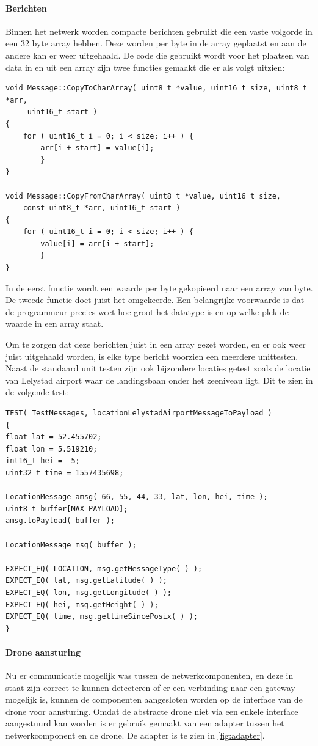 \documentclass[a4paper, 11pt, oneside]{report}
\begin{document}
\paragraph{Berichten}
Binnen het netwerk worden compacte berichten gebruikt die een vaste volgorde in een 32 byte array hebben.
Deze worden per byte in de array geplaatst en aan de andere kan er weer uitgehaald.
De code die gebruikt wordt voor het plaatsen van data in en uit een array zijn twee functies gemaakt die er als volgt uitzien:
\begin{lstlisting}
void Message::CopyToCharArray( uint8_t *value, uint16_t size, uint8_t *arr,
	 uint16_t start )
{
	for ( uint16_t i = 0; i < size; i++ ) {
		arr[i + start] = value[i];
		}
}

void Message::CopyFromCharArray( uint8_t *value, uint16_t size,
	const uint8_t *arr, uint16_t start )
{
	for ( uint16_t i = 0; i < size; i++ ) {
		value[i] = arr[i + start];
		}
}
\end{lstlisting}
In de eerst functie wordt een waarde per byte gekopieerd naar een array van byte.
De tweede functie doet juist het omgekeerde.
Een belangrijke voorwaarde is dat de programmeur precies weet hoe groot het datatype is en op welke plek de waarde in een array staat. 


Om te zorgen dat deze berichten juist in een array gezet worden, en er ook weer juist uitgehaald worden, is elke type bericht voorzien een meerdere unittesten.
Naast de standaard unit testen zijn ook bijzondere locaties getest zoals de locatie van Lelystad airport waar de landingsbaan onder het zeeniveau ligt.
Dit te zien in de volgende test:
\begin{lstlisting}
TEST( TestMessages, locationLelystadAirportMessageToPayload )
{
float lat = 52.455702;
float lon = 5.519210;
int16_t hei = -5;
uint32_t time = 1557435698;

LocationMessage amsg( 66, 55, 44, 33, lat, lon, hei, time );
uint8_t buffer[MAX_PAYLOAD];
amsg.toPayload( buffer );

LocationMessage msg( buffer );

EXPECT_EQ( LOCATION, msg.getMessageType( ) );
EXPECT_EQ( lat, msg.getLatitude( ) );
EXPECT_EQ( lon, msg.getLongitude( ) );
EXPECT_EQ( hei, msg.getHeight( ) );
EXPECT_EQ( time, msg.gettimeSincePosix( ) );
}
\end{lstlisting}

\paragraph{Drone aansturing}
Nu er communicatie mogelijk was tussen de netwerkcomponenten, en deze in staat zijn correct te kunnen detecteren of er een verbinding naar een gateway mogelijk is, kunnen de componenten aangesloten worden op de interface van de drone voor aansturing.
Omdat de abstracte drone niet via een enkele interface aangestuurd kan worden is er gebruik gemaakt van een adapter \cite{adapter} tussen het netwerkcomponent en de drone. 
De adapter is te zien in \autoref{fig:adapter}.
\end{document}
